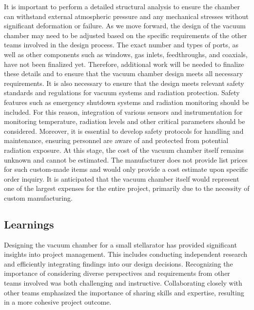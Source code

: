 It is important to perform a detailed structural analysis to ensure the chamber can withstand external atmospheric pressure and any mechanical stresses without significant deformation or failure.
As we move forward, the design of the vacuum chamber may need to be adjusted based on the specific requirements of the other teams involved in the design process.
The exact number and types of ports, as well as other components such as windows, gas inlets, feedthroughs, and coaxials, have not been finalized yet.
Therefore, additional work will be needed to finalize these details and to ensure that the vacuum chamber design meets all necessary requirements.
It is also necessary to ensure that the design meets relevant safety standards and regulations for vacuum systems and radiation protection.
Safety features such as emergency shutdown systems and radiation monitoring should be included.
For this reason, integration of various sensors and instrumentation for monitoring temperature, radiation levels and other critical parameters should be considered.
Moreover, it is essential to develop safety protocols for handling and maintenance, ensuring personnel are aware of and protected from potential radiation exposure.
At this stage, the cost of the vacuum chamber itself remains unknown and cannot be estimated.
The manufacturer does not provide list prices for such custom-made items and would only provide a cost estimate upon specific order inquiry.
It is anticipated that the vacuum chamber itself would represent one of the largest expenses for the entire project, primarily due to the necessity of custom manufacturing.

\subsection{Learnings}

Designing the vacuum chamber for a small stellarator has provided significant insights into project management.
This includes conducting independent research and efficiently integrating findings into our design decisions.
Recognizing the importance of considering diverse perspectives and requirements from other teams involved was both challenging and instructive.
Collaborating closely with other teams emphasized the importance of sharing skills and expertise, resulting in a more cohesive project outcome.
